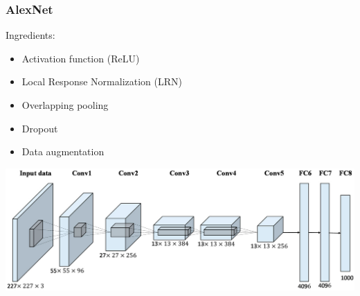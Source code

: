 \begin{frame}
	\frametitle{AlexNet}
	
	
	\bigskip
	
	 Ingredients: 
	 \begin{itemize}
	 	\item Activation function (ReLU)
	 	\item Local Response Normalization (LRN)
	 	\item Overlapping pooling
	 	\item Dropout
	 	\item Data augmentation
	 \end{itemize}
 
 \bigskip
 
\begin{center}
	\includegraphics[scale=0.6]{figs/AlexNet}
\end{center}

\end{frame}

